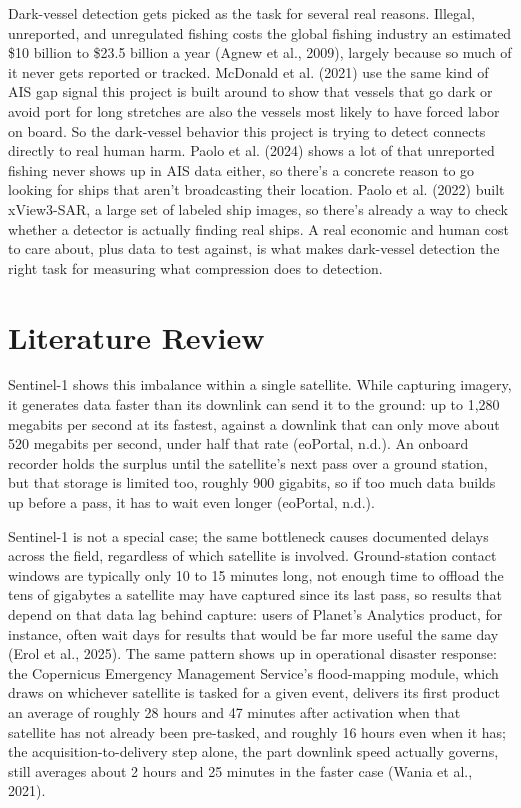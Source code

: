 \documentclass[11pt]{article}
\begin{document}
Dark-vessel detection gets picked as the task for several real reasons. Illegal, unreported, and unregulated fishing costs the global fishing industry an estimated \$10 billion to \$23.5 billion a year (Agnew et al., 2009), largely because so much of it never gets reported or tracked. McDonald et al. (2021) use the same kind of AIS gap signal this project is built around to show that vessels that go dark or avoid port for long stretches are also the vessels most likely to have forced labor on board. So the dark-vessel behavior this project is trying to detect connects directly to real human harm. Paolo et al. (2024) shows a lot of that unreported fishing never shows up in AIS data either, so there's a concrete reason to go looking for ships that aren't broadcasting their location. Paolo et al. (2022) built xView3-SAR, a large set of labeled ship images, so there's already a way to check whether a detector is actually finding real ships. A real economic and human cost to care about, plus data to test against, is what makes dark-vessel detection the right task for measuring what compression does to detection.

\section{Literature Review}

Sentinel-1 shows this imbalance within a single satellite. While capturing imagery, it generates data faster than its downlink can send it to the ground: up to 1,280 megabits per second at its fastest, against a downlink that can only move about 520 megabits per second, under half that rate (eoPortal, n.d.). An onboard recorder holds the surplus until the satellite's next pass over a ground station, but that storage is limited too, roughly 900 gigabits, so if too much data builds up before a pass, it has to wait even longer (eoPortal, n.d.).

Sentinel-1 is not a special case; the same bottleneck causes documented delays across the field, regardless of which satellite is involved. Ground-station contact windows are typically only 10 to 15 minutes long, not enough time to offload the tens of gigabytes a satellite may have captured since its last pass, so results that depend on that data lag behind capture: users of Planet's Analytics product, for instance, often wait days for results that would be far more useful the same day (Erol et al., 2025). The same pattern shows up in operational disaster response: the Copernicus Emergency Management Service's flood-mapping module, which draws on whichever satellite is tasked for a given event, delivers its first product an average of roughly 28 hours and 47 minutes after activation when that satellite has not already been pre-tasked, and roughly 16 hours even when it has; the acquisition-to-delivery step alone, the part downlink speed actually governs, still averages about 2 hours and 25 minutes in the faster case (Wania et al., 2021).
\end{document}
